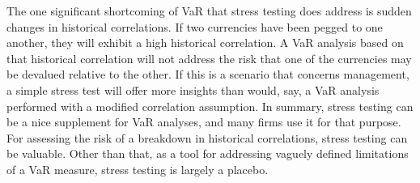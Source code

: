 

The one significant shortcoming of VaR that stress testing does address is sudden changes in historical correlations. If two currencies have been pegged to one another, they will exhibit a high historical correlation. A VaR analysis based on that historical correlation will not address the risk that one of the currencies may be devalued relative to the other. If this is a scenario that concerns management, a simple stress test will offer more insights than would, say, a VaR analysis performed with a modified correlation assumption.
In summary, stress testing can be a nice supplement for VaR analyses, and many firms use it for that purpose. For assessing the risk of a breakdown in historical correlations, stress testing can be valuable. Other than that, as a tool for addressing vaguely defined limitations of a VaR measure, stress testing is largely a placebo.
